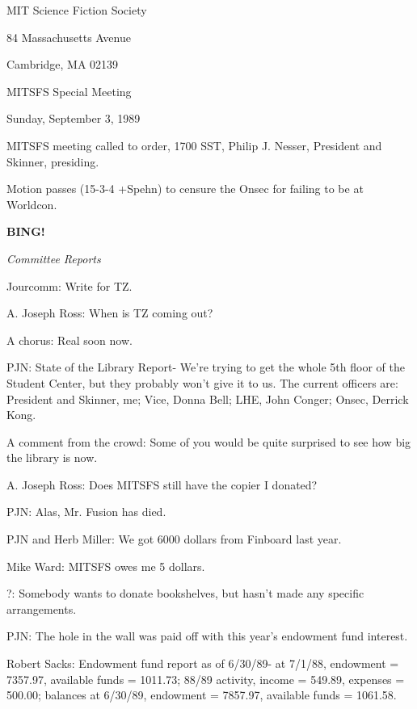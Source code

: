 \documentclass[12pt]{article}
\newcommand{\bing}{{\bf BING!} }
\newcommand{\goto}[1]{\bing \vskip 12pt \centerline{{\em{#1}}}}
\begin{document}
\begin{center}

MIT Science Fiction Society 

84 Massachusetts Avenue

Cambridge, MA 02139

\vspace{12pt}

MITSFS Special Meeting

Sunday, September 3, 1989

\end{center}
 
\vspace{18pt}

\setlength{\parskip}{6pt}

\noindent
MITSFS meeting called to order, 1700 SST, Philip J. Nesser, President and Skinner, presiding.

Motion passes (15-3-4 +Spehn) to censure the Onsec for failing to be at Worldcon.

\goto{Committee Reports}

Jourcomm: Write for TZ.

A. Joseph Ross: When is TZ coming out?

A chorus: Real soon now.

PJN: State of the Library Report- We're trying to get the whole 5th floor of the Student Center, but they probably won't give it to us. The current officers are: President and Skinner, me; Vice, Donna Bell; LHE, John Conger; Onsec, Derrick Kong.

A comment from the crowd: Some of you would be quite surprised to see how big the library is now.

A. Joseph Ross: Does MITSFS still have the copier I donated?

PJN: Alas, Mr. Fusion has died.

PJN and Herb Miller: We got 6000 dollars from Finboard last year.

Mike Ward: MITSFS owes me 5 dollars.

?: Somebody wants to donate bookshelves, but hasn't made any specific arrangements.

PJN: The hole in the wall was paid off with this year's endowment fund interest.

Robert Sacks: Endowment fund report as of 6/30/89- at 7/1/88, endowment = 7357.97, available funds = 1011.73; 88/89 activity, income = 549.89, expenses = 500.00; balances at 6/30/89, endowment = 7857.97, available funds = 1061.58.
\end{document}
